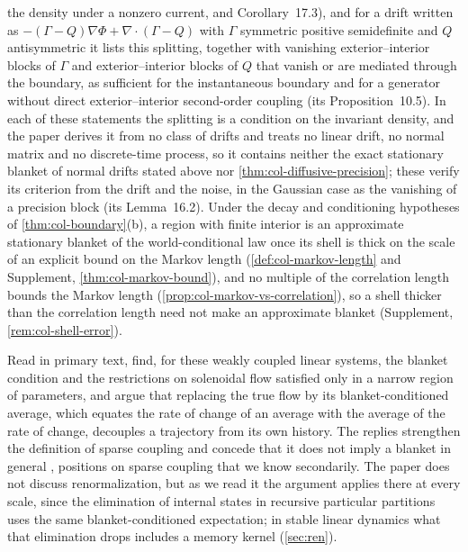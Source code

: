 the density under a nonzero current, and Corollary~17.3), and for a drift written as $-(\Gamma-Q)\nabla\Phi+\nabla\cdot(\Gamma-Q)$ with $\Gamma$ symmetric positive semidefinite and $Q$ antisymmetric it lists this splitting, together with vanishing exterior--interior blocks of $\Gamma$ and exterior--interior blocks of $Q$ that vanish or are mediated through the boundary, as sufficient for the instantaneous boundary and for a generator without direct exterior--interior second-order coupling (its Proposition~10.5). In each of these statements the splitting is a condition on the invariant density, and the paper derives it from no class of drifts and treats no linear drift, no normal matrix and no discrete-time process, so it contains neither the exact stationary blanket of normal drifts stated above nor \cref{thm:col-diffusive-precision}; these verify its criterion from the drift and the noise, in the Gaussian case as the vanishing of a precision block (its Lemma~16.2). Under the decay and conditioning hypotheses of \cref{thm:col-boundary}(b), a region with finite interior is an approximate stationary blanket of the world-conditional law once its shell is thick on the scale of an explicit bound on the Markov length (\cref{def:col-markov-length} and Supplement, \cref{thm:col-markov-bound}), and no multiple of the correlation length bounds the Markov length (\cref{prop:col-markov-vs-correlation}), so a shell thicker than the correlation length need not make an approximate blanket (Supplement, \cref{rem:col-shell-error}).

Read in primary text, \citet{aguilera2022particular} find, for these weakly coupled linear systems, the blanket condition and the restrictions on solenoidal flow satisfied only in a narrow region of parameters, and argue that replacing the true flow by its blanket-conditioned average, which equates the rate of change of an average with the average of the rate of change, decouples a trajectory from its own history. The replies strengthen the definition of sparse coupling \citep{friston2022very,friston2023simpler} and concede that it does not imply a blanket in general \citep{heins2022sparse}, positions on sparse coupling that we know secondarily. The paper does not discuss renormalization, but as we read it the argument applies there at every scale, since the elimination of internal states in recursive particular partitions uses the same blanket-conditioned expectation; in stable linear dynamics what that elimination drops includes a memory kernel (\cref{sec:ren}).

